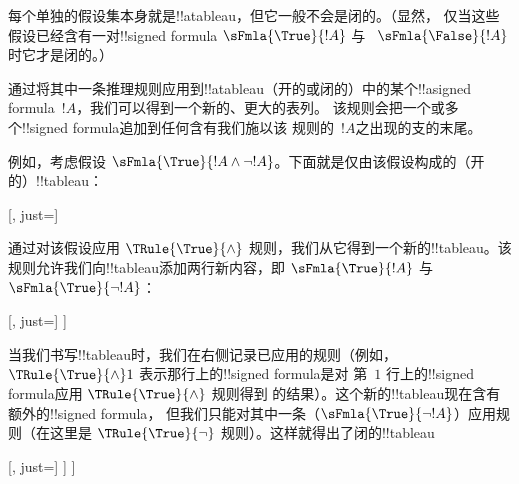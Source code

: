 \documentclass[../../../include/open-logic-section]{subfiles}
\begin{document}
\begin{ex}
  每个单独的假设集本身就是!!a{tableau}，但它一般不会是闭的。（显然，
  仅当这些假设已经含有一对!!{signed formula} $\sFmla{\True}{!A}$ 与
  ~$\sFmla{\False}{!A}$ 时它才是闭的。）

  通过将其中一条推理规则应用到!!a{tableau}（开的或闭的）中的某个!!a{signed formula}~$!A$，我们可以得到一个新的、更大的表列。
  该规则会把一个或多个!!{signed formula}追加到任何含有我们施以该
  规则的~$!A$之出现的支的末尾。

  例如，考虑假设 $\sFmla{\True}{!A \land \lnot
    !A}$。下面就是仅由该假设构成的（开的）!!{tableau}：
  \begin{center}
    \begin{tableau}{}
      [, just=\TAss]
    \end{tableau}{}
  \end{center}
  通过对该假设应用 $\TRule{\True}{\land}$ 规则，我们从它得到一个新的!!{tableau}。该规则允许我们向!!{tableau}添加两行新内容，即
  $\sFmla{\True}{!A}$ 与 $\sFmla{\True}{\lnot !A}$：
  \begin{center}
    \begin{tableau}{}
      [, just=\TAss
        [\sFmla{\True}{\formula{A}}, just={\TRule{\True}{\land}[1]},
          [\sFmla{\True}{\lnot \formula{A}}, just={\TRule{\True}{\land}[1]}
          ]
        ]
      ]
    \end{tableau}{}
  \end{center}
  当我们书写!!{tableau}时，我们在右侧记录已应用的规则（例如，
  $\TRule{\True}{\land} 1$ 表示那行上的!!{signed formula}是对
  第~$1$ 行上的!!{signed formula}应用 $\TRule{\True}{\land}$ 规则得到
  的结果）。这个新的!!{tableau}现在含有额外的!!{signed formula}，
  但我们只能对其中一条（$\sFmla{\True}{\lnot !A}$）应用规则（在这里是
  $\TRule{\True}{\lnot}$ 规则）。这样就得出了闭的!!{tableau}
  \begin{center}
    \begin{tableau}{}
      [, just=\TAss
        [\sFmla{\True}{\formula{A}}, just={\TRule{\True}{\land}[1]}
          [\sFmla{\True}{\lnot \formula{A}}, just={\TRule{\True}{\land}[1]}
            [\sFmla{\False}{\formula{A}}, just={\TRule{\True}{\lnot}[3]}, close]
          ]
        ]
      ]
    \end{tableau}{}
  \end{center}
\end{ex}
\end{document}
